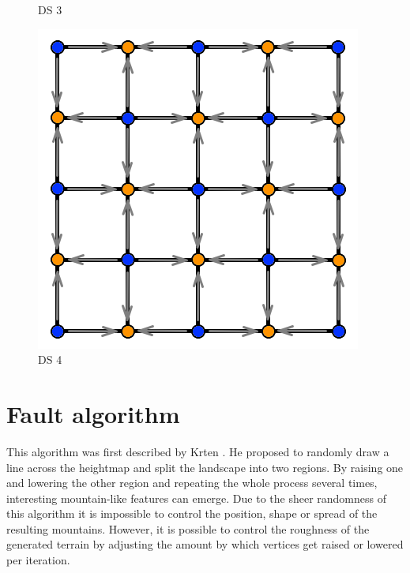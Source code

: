 \documentclass[11pt,a4paper,twoside,openright]{report}
\begin{document}
\begin{figure}[!htb]
  \caption{DS 3}\label{fig:ds4}
\endminipage
{}%
  \includegraphics[width=\linewidth]{ds5.png}
  \caption{DS 4}\label{fig:ds5}
\endminipage
\end{figure}

\section{Fault algorithm}
This algorithm was first described by Krten \cite{Krten:1994}. He proposed to randomly draw a line across the heightmap and split the landscape into two regions. By raising one and lowering the other region and repeating the whole process several times, interesting mountain-like features can emerge. Due to the sheer randomness of this algorithm it is impossible to control the position, shape or spread of the resulting mountains. However, it is possible to control the roughness of the generated terrain by adjusting the amount by which vertices get raised or lowered per iteration.
\end{document}
